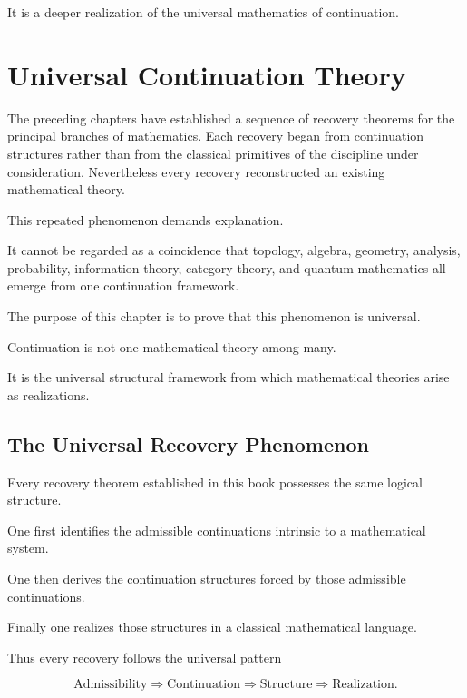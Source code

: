 \documentclass[13pt,openany]{book}
\theoremstyle{plain}
\theoremstyle{definition}
\begin{document}
It is a deeper realization of the universal mathematics of continuation.

\chapter{Universal Continuation Theory}

The preceding chapters have established a sequence of recovery theorems for the
principal branches of mathematics. Each recovery began from continuation
structures rather than from the classical primitives of the discipline under
consideration. Nevertheless every recovery reconstructed an existing
mathematical theory.

This repeated phenomenon demands explanation.

It cannot be regarded as a coincidence that topology, algebra, geometry,
analysis, probability, information theory, category theory, and quantum
mathematics all emerge from one continuation framework.

The purpose of this chapter is to prove that this phenomenon is universal.

Continuation is not one mathematical theory among many.

It is the universal structural framework from which mathematical theories arise
as realizations.

\section{The Universal Recovery Phenomenon}

Every recovery theorem established in this book possesses the same logical
structure.

One first identifies the admissible continuations intrinsic to a mathematical
system.

One then derives the continuation structures forced by those admissible
continuations.

Finally one realizes those structures in a classical mathematical language.

Thus every recovery follows the universal pattern

\[
\boxed{
\text{Admissibility}
\Longrightarrow
\text{Continuation}
\Longrightarrow
\text{Structure}
\Longrightarrow
\text{Realization}.
}
\]
\end{document}
